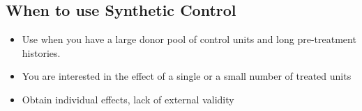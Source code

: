 \documentclass[11pt]{exam}
\begin{document}
\subsection{When to use Synthetic Control}
\begin{itemize}
    \item Use when you have a large donor pool of control units and long pre-treatment histories.
    \item You are interested in the effect of a single or a small number of treated units
    \item Obtain individual effects, lack of external validity
\end{itemize}









\endgroup

\newpage


\end{document}
